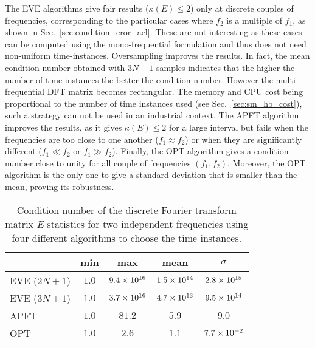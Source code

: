 The EVE algorithms give fair results ($\kappa(E) \leq 2$) only at
discrete couples of frequencies, corresponding to the particular cases where $f_2$ is a
multiple of $f_1$, as shown in Sec.~\ref{sec:condition_cror_ael}. These are not interesting as these
cases can be computed using the mono-frequential formulation and thus does not
need non-uniform time-instances. Oversampling improves the results. 
In fact, the mean condition number obtained
with $3N + 1$ samples indicates that the higher the number of time instances
the better the condition number. However the multi-frequential DFT
matrix becomes rectangular. The memory and CPU cost being proportional to 
the number of time instances used (see Sec.~\ref{sec:sm_hb_cost}), 
such a strategy can not be
used in an industrial context. The APFT
algorithm improves the results, as it gives $\kappa (E) \leq 2$ 
for a large interval but fails when the frequencies
are too close to one another ($f_1 \approx f_2$) or when they are significantly
different ($f_1 \ll f_2$ or $f_1 \gg f_2$).  
Finally, the OPT algorithm gives a condition number close to unity for
all couple of frequencies $(f_1, f_2)$. Moreover, the OPT algorithm is
the only one to give a standard deviation that is smaller than the mean,
proving its robustness.
\begin{table}[htb]
  \centering
  \begin{tabular}{lcccc}
    \toprule
    \phantom{abdefghijk} & min & max & mean & $\sigma$ \\
    \midrule
    EVE ($2N + 1$) & $1.0$ & $9.4\times 10^{16}$ & $1.5\times 10^{14}$ & $2.8\times 10^{15}$ \\
    EVE ($3N + 1$) & $1.0$ & $3.7\times 10^{16}$ & $4.7\times 10^{13}$ & $9.5\times 10^{14}$ \\
    APFT & $1.0$ & $81.2$ & $5.9$ & $9.0$ \\
    OPT & $1.0$ & $2.6$ & $1.1$ & $7.7\times 10^{-2}$ \\
    \bottomrule
  \end{tabular}
  \caption{Condition number of the discrete Fourier transform matrix $E$
  statistics for two independent frequencies using four different algorithms
  to choose the time instances.}
  \label{tab:algo_sum}
\end{table} 

